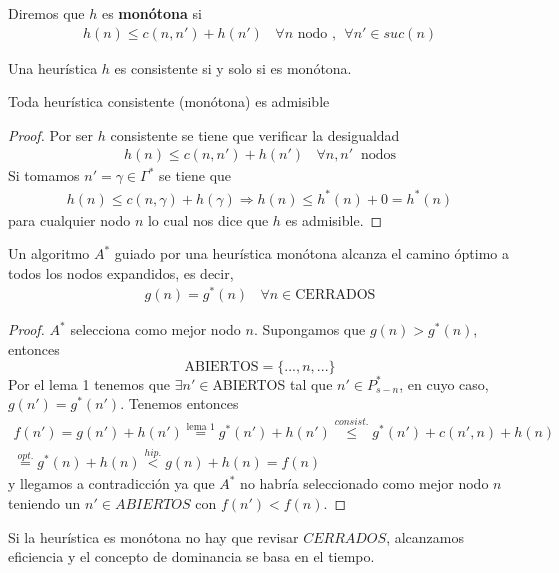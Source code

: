 \begin{definicion}
    Diremos que $h$ es \textbf{monótona} si
    \begin{gather*}
        h(n)\leq c(n,n')+h(n') \ \ \ \ \forall n \text{ nodo },\ \ \forall n'\in suc(n)
    \end{gather*}
\end{definicion}

\begin{prop}
    Una heurística $h$ es consistente si y solo si es monótona.
\end{prop}

\begin{teo}
    Toda heurística consistente (monótona) es admisible
    \begin{proof}
        Por ser $h$ consistente se tiene que verificar la desigualdad
        \begin{gather*}
            h(n) \leq c(n,n') + h(n') \ \ \ \ \forall n,n' \ \text{ nodos}
        \end{gather*}
        Si tomamos $n'=\gamma \in \Gamma^*$ se tiene que 
        \begin{gather*}
            h(n) \leq c(n,\gamma) + h(\gamma) \Rightarrow h(n) \leq h^*(n) + 0 = h^*(n)
        \end{gather*}
        para cualquier nodo $n$ lo cual nos dice que $h$ es admisible.
    \end{proof}
\end{teo}

\begin{teo}
    Un algoritmo $A^*$ guiado por una heurística monótona alcanza el camino óptimo a todos los nodos expandidos, es decir, 
    \begin{gather*}
        g(n) = g^*(n)\ \ \ \ \forall n \in \text{CERRADOS}
    \end{gather*}
    \begin{proof}
        $A^*$ selecciona como mejor nodo $n$. Supongamos que $g(n)>g^*(n)$, entonces 
        \begin{equation*}
            \text{ABIERTOS} = \{..., n, ...\}
        \end{equation*}
        Por el lema 1 tenemos que $\exists n'\in$ABIERTOS tal que $n'\in P^*_{s-n}$, en cuyo caso, $g(n')=g^*(n')$. Tenemos entonces
        \begin{gather*}
            f(n') = g(n') + h(n') \overset{\text{lema 1}}{=} g^*(n') + h(n') \overset{consist.}{\leq} g^*(n') + c(n',n) + h(n) \\
            \overset{opt.}{=} g^*(n)+h(n) \overset{hip.}{<} g(n)+h(n)=f(n)
        \end{gather*}
        y llegamos a contradicción ya que $A^*$ no habría seleccionado como mejor nodo $n$ teniendo un $n'\in ABIERTOS$ con $f(n')<f(n)$.
    \end{proof}
\end{teo}

\begin{observacion}
    Si la heurística es monótona no hay que revisar $CERRADOS$, alcanzamos eficiencia y el concepto de dominancia se basa en el tiempo.
\end{observacion}